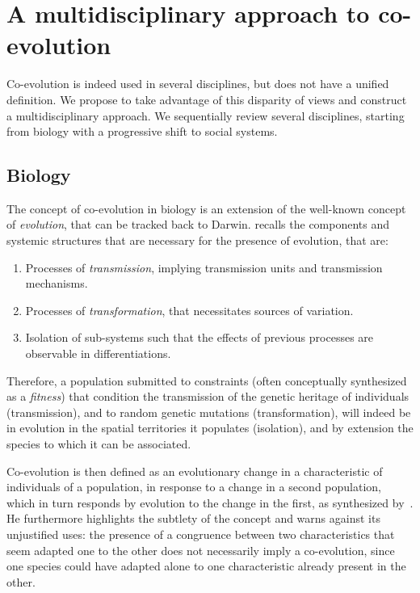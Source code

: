 \documentclass[letterpaper]{article}
\begin{document}
\section{A multidisciplinary approach to co-evolution}

Co-evolution is indeed used in several disciplines, but does not have a unified definition. We propose to take advantage of this disparity of views and construct a multidisciplinary approach. We sequentially review several disciplines, starting from biology with a progressive shift to social systems.


\subsection{Biology}

The concept of co-evolution in biology is an extension of the well-known concept of \emph{evolution}, that can be tracked back to Darwin. \cite{durham1991coevolution} recalls the components and systemic structures that are necessary for the presence of evolution, that are:

\begin{enumerate}
\item Processes of \emph{transmission}, implying transmission units and transmission mechanisms.
\item Processes of \emph{transformation}, that necessitates sources of variation.
\item Isolation of sub-systems such that the effects of previous processes are observable in differentiations.
\end{enumerate}

Therefore, a population submitted to constraints (often conceptually synthesized as a \emph{fitness}) that condition the transmission of the genetic heritage of individuals (transmission), and to random genetic mutations (transformation), will indeed be in evolution in the spatial territories it populates (isolation), and by extension the species to which it can be associated. 

Co-evolution is then defined as an evolutionary change in a characteristic of individuals of a population, in response to a change in a second population, which in turn responds by evolution to the change in the first, as synthesized by~\cite{janzen1980coevolution}. He furthermore highlights the subtlety of the concept and warns against its unjustified uses: the presence of a congruence between two characteristics that seem adapted one to the other does not necessarily imply a co-evolution, since one species could have adapted alone to one characteristic already present in the other.
\end{document}
